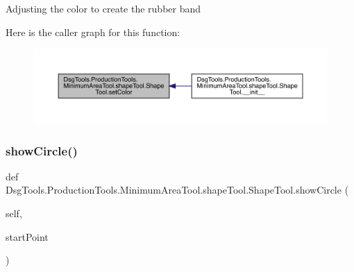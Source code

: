 \begin{DoxyVerb}Adjusting the color to create the rubber band
\end{DoxyVerb}
 Here is the caller graph for this function\+:
\nopagebreak
\begin{figure}[H]
\begin{center}
\leavevmode
\includegraphics[width=350pt]{class_dsg_tools_1_1_production_tools_1_1_minimum_area_tool_1_1shape_tool_1_1_shape_tool_ad5d51bbe618c8824ed4ef49cb2881865_icgraph}
\end{center}
\end{figure}
\mbox{\label{class_dsg_tools_1_1_production_tools_1_1_minimum_area_tool_1_1shape_tool_1_1_shape_tool_a1f5cb36960ca5dfe9b2fbf08763d80f0}} 
\subsubsection{\texorpdfstring{show\+Circle()}{showCircle()}}
{\footnotesize\ttfamily def Dsg\+Tools.\+Production\+Tools.\+Minimum\+Area\+Tool.\+shape\+Tool.\+Shape\+Tool.\+show\+Circle (\begin{DoxyParamCaption}\item[{}]{self,  }\item[{}]{start\+Point }\end{DoxyParamCaption})}

